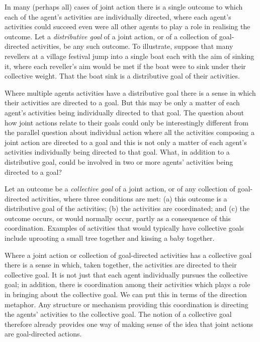 \documentclass[12pt,a4paper]{extarticle}
\begin{document}
In many (perhaps all) cases of joint action there is a single outcome to which each of the agent's activities are individually directed, where each agent's activities could succeed even were all other agents to play a role in realising the outcome.  
Let a \emph{distributive goal} of a joint action, or of a collection of goal-directed activities, be any such outcome.  
To illustrate, suppose that many revellers at a village festival jump into a single boat each with the aim of sinking it, where each reveller's aim would be met if the boat were to sink under their collective weight.  
That the boat sink is a distributive goal of their activities.


Where multiple agents activities have a distributive goal there is a sense in which their activities are directed to a goal.  But this may be only a matter of each agent's activities being individually directed to that goal.  The question about how joint actions relate to their goals could only be interestingly different from the parallel question about individual action where all the activities composing a joint action are directed to a goal and this is not only a matter of each agent's activities individually being directed to that goal.
What, in addition to a distributive goal, could be involved in two or more agents' activities being directed to a goal?

Let an outcome be a \emph{collective goal} of a joint action, or of any collection of goal-directed activities, where three conditions are met: (a) this outcome is a distributive goal of the activities; (b) the activities are coordinated; and (c) the outcome occurs, or would normally occur, partly as a consequence of this coordination.  Examples of activities that would typically have collective goals include uprooting a small tree together and kissing a baby together.

Where a joint action or collection of goal-directed activities has a collective goal there is a sense in which, taken together, the activities are directed to their collective goal.  It is not just that each agent individually pursues the collective goal; in addition, there is coordination among their activities which plays a role in bringing about the collective goal.  We can put this in terms of the direction metaphor.  Any structure or mechanism providing this coordination is directing the agents' activities to the collective goal.  The notion of a collective goal therefore already provides one way of making sense of the idea that joint actions are goal-directed actions.
\end{document}
